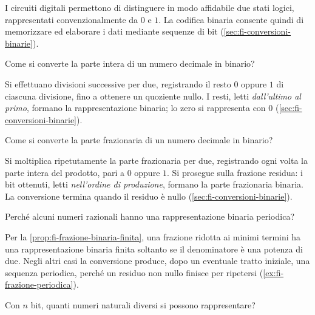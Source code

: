 I circuiti digitali permettono di distinguere in modo affidabile due
stati logici, rappresentati convenzionalmente da \(0\) e \(1\).
La codifica binaria consente quindi di memorizzare ed elaborare
i dati mediante sequenze di bit
(\cref{sec:fi-conversioni-binarie}).

\begin{exercise}
\label{ex:fi-rappresentazione-conversione-parte-intera}
Come si converte la parte intera di un numero decimale in binario?
\end{exercise}

Si effettuano divisioni successive per due, registrando il resto
\(0\) oppure \(1\) di ciascuna divisione, fino a ottenere un quoziente
nullo. I resti, letti \emph{dall'ultimo al primo}, formano la
rappresentazione binaria; lo zero si rappresenta con \(0\)
(\cref{sec:fi-conversioni-binarie}).

\begin{exercise}
\label{ex:fi-rappresentazione-conversione-parte-frazionaria}
Come si converte la parte frazionaria di un numero decimale in binario?
\end{exercise}

Si moltiplica ripetutamente la parte frazionaria per due, registrando
ogni volta la parte intera del prodotto, pari a \(0\) oppure \(1\).
Si prosegue sulla frazione residua: i bit ottenuti, letti
\emph{nell'ordine di produzione}, formano la parte frazionaria
binaria. La conversione termina quando il residuo è nullo
(\cref{sec:fi-conversioni-binarie}).

\clearpage

\begin{exercise}
\label{ex:fi-rappresentazione-frazioni-periodiche}
Perché alcuni numeri razionali hanno una rappresentazione binaria
periodica?
\end{exercise}

Per la \cref{prop:fi-frazione-binaria-finita}, una frazione ridotta
ai minimi termini ha una rappresentazione binaria finita soltanto
se il denominatore è una potenza di due. Negli altri casi la
conversione produce, dopo un eventuale tratto iniziale, una sequenza
periodica, perché un residuo non nullo finisce per ripetersi
(\cref{ex:fi-frazione-periodica}).

\begin{exercise}
\label{ex:fi-rappresentazione-configurazioni-n-bit}
Con \(n\) bit, quanti numeri naturali diversi si possono rappresentare?
\end{exercise}

